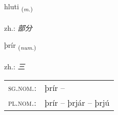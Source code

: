 \documentclass[frontgrid, backgrid]{flacards}\usepackage[]{graphicx}\usepackage[]{xcolor}
\begin{document}
\renewcommand{\flhead}{\vskip5pt \fboxsep=0pt {\small\bfseries\footnotesize Nafnorð | 名词}}
\renewcommand{\fcfoot}{\vskip5pt \fboxsep=0pt \hspace{2pt}{\small\bfseries\footnotesize 1K}}

\renewcommand{\blhead}{\vskip5pt {\small\bfseries\footnotesize Nafnorð | 名词 }}
\renewcommand{\bcfoot}{\vskip5pt \hspace{2pt}{\small\bfseries\footnotesize 1K}}


{hluti \small{\textsubscript{(\textit{m.})}} \\[1ex] %
\textphonetic{[l̥ʏːtɪ]} \\
zh.: \emph{部分} \\  [2ex]
\renewcommand*{\arraystretch}{0.8}
}

\renewcommand{\flhead}{\vskip5pt \fboxsep=0pt {\small\bfseries\footnotesize Töluorð | 数量词}}
\renewcommand{\fcfoot}{\vskip5pt \fboxsep=0pt \hspace{2pt}{\small\bfseries\footnotesize 1K}}

\renewcommand{\blhead}{\vskip5pt {\small\bfseries\footnotesize Töluorð | 数量词 }}
\renewcommand{\bcfoot}{\vskip5pt \hspace{2pt}{\small\bfseries\footnotesize 1K}}


{þrír \small{\textsubscript{(\textit{num.})}} \\[1ex] %
\textphonetic{[θriːr]} \\
zh.: \emph{三} \\  [2ex]
\renewcommand*{\arraystretch}{0.8}
\begin{tabular}{ll}
\textsc{sg.nom.}: & þrír  -- \\ 
\textsc{pl.nom.}: & þrír -- þrjár -- þrjú
\end{tabular}
}
\end{document}
